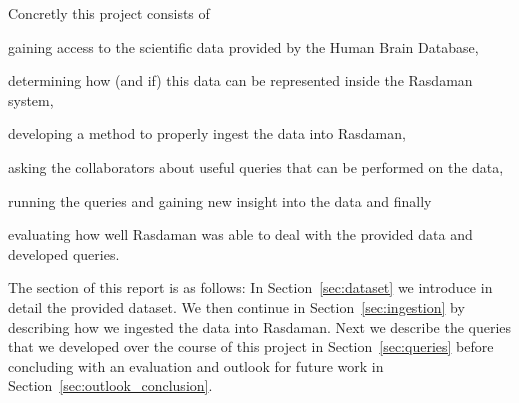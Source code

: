 Concretly this project consists of
\begin{inparaenum}[(1)]
\item gaining access to the scientific data provided by the Human Brain Database, 
\item determining how (and if) this data can be represented inside the Rasdaman system, 
\item developing a method to properly ingest the data into Rasdaman, 
\item asking the collaborators about useful queries that can be performed on the data, 
\item running the queries and gaining new insight into the data and finally
\item evaluating how well Rasdaman was able to deal with the provided data and developed queries. 
\end{inparaenum}

The section of this report is as follows: In Section~\ref{sec:dataset} we introduce in detail the provided dataset. We then continue in Section~\ref{sec:ingestion} by describing how we ingested the data into Rasdaman. Next we describe the queries that we developed over the course of this project in Section~\ref{sec:queries} before concluding with an evaluation and outlook for future work in Section~\ref{sec:outlook_conclusion}. 